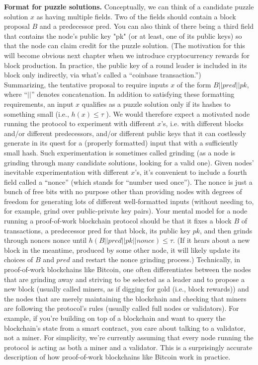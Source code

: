 \noindent
\textbf{Format for puzzle solutions.} Conceptually, we can think of a candidate puzzle solution $x$ as having multiple fields. Two of the fields should contain a block proposal $B$ and a predecessor pred. You can also think of there being a third field that contains the node’s
public key "pk" (or at least, one of its public keys) so that the node can claim credit for the
puzzle solution. (The motivation for this will become obvious next chapter when we introduce cryptocurrency rewards
for block production. In practice, the public key of a round leader is included in its block only indirectly,
via what’s called a “coinbase transaction.”)\\

Summarizing, the tentative proposal to require inputs $x$ of the form $B||pred||pk$, where
“$||$” denotes concatenation. In addition to satisfying these formatting requirements, an input $x$ qualifies as a puzzle solution only if its hashes to something small (i.e., $h(x) \leq \tau$ ). We would therefore expect a motivated node running the protocol to experiment
with different $x$’s, i.e. with different blocks and/or different predecessors, and/or different
public keys that it can costlessly generate in its quest for a (properly formatted) input that
with a sufficiently small hash. Such experimentation is sometimes called grinding (as a node
is grinding through many candidate solutions, looking for a valid one).
Given nodes’ inevitable experimentation with different $x$’s, it’s convenient to include a
fourth field called a “nonce” (which stands for “number used once”). The nonce is just a
bunch of free bits with no purpose other than providing nodes with degrees of freedom for
generating lots of different well-formatted inputs (without needing to, for example, grind
over public-private key pairs).
Your mental model for a node running a proof-of-work blockchain protocol should be that it
fixes a block $B$ of transactions, a predecessor pred for that block, its public key $pk$, and then
grinds through nonces nonce until $h(B||pred||pk||nonce) \leq \tau$. (If it hears about a new block
in the meantime, produced by some other node, it will likely update its choices of $B$ and $pred$
and restart the nonce grinding process.) Technically, in proof-of-work blockchains like Bitcoin, one often differentiates between the nodes that
are grinding away and striving to be selected as a leader and to propose a new block (usually called miners,
as if digging for gold (i.e., block rewards)) and the nodes that are merely maintaining the blockchain and
checking that miners are following the protocol’s rules (usually called full nodes or validators). For example, if you’re building on top of a blockchain and want to query the blockchain’s state from a smart contract,
you care about talking to a validator, not a miner. For simplicity, we’re currently assuming that every node
running the protocol is acting as both a miner and a validator.
This is a surprisingly accurate description of how proof-of-work blockchains like Bitcoin work in practice.

